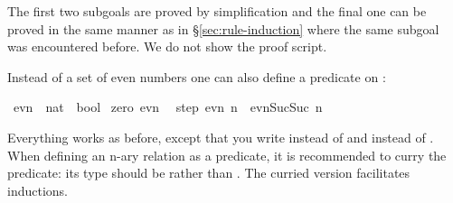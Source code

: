 \begin{isabellebody}
\begin{isamarkuptxt}
The first two subgoals are proved by simplification and the final one can be
proved in the same manner as in \S\ref{sec:rule-induction}
where the same subgoal was encountered before.
We do not show the proof script.%
\end{isamarkuptxt}%
\isamarkuptrue%
%
\endisatagproof
{\isafoldproof}%
%
\isadelimproof
%
\endisadelimproof
%
\isamarkuptrue%
%
\begin{isamarkuptext}%
Instead of a set of even numbers one can also define a predicate on :%
\end{isamarkuptext}%
\isamarkuptrue%
\isamarkupfalse%
\ evn\ {}{}\ {}nat\ {}\ bool{}\ \isanewline
zero{}\ {}evn\ {}{}\ {}\isanewline
step{}\ {}evn\ n\ {}\ evn{}Suc{}Suc\ n{}{}{}%
\begin{isamarkuptext}%
\noindent Everything works as before, except that
you write  instead of  and
 instead of .
When defining an n-ary relation as a predicate, it is recommended to curry
the predicate: its type should be \mbox{}
rather than
. The curried version facilitates inductions.


\end{isamarkuptext}
\end{isabellebody}
